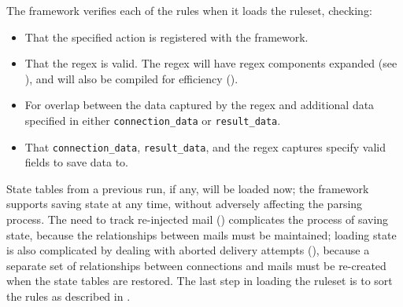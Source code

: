 The framework verifies each of the rules when it loads the ruleset,
checking:

\begin{itemize}

    \squeezeitems{}

    \item That the specified action is registered with the framework.

    \item That the regex is valid.  The regex will have regex components
        expanded (see ), and will also be
        compiled for efficiency ().

    \item For overlap between the data captured by the regex and additional
        data specified in either \texttt{connection\_data} or
        \texttt{result\_data}.

    \item That \texttt{connection\_data}, \texttt{result\_data}, and the
        regex captures specify valid fields to save data to.

\end{itemize}

State tables from a previous \parsername{} run, if any, will be loaded now;
the framework supports saving state at any time, without adversely
affecting the parsing process.  The need to track re-injected mail
() complicates the process of saving state,
because the relationships between mails must be maintained; loading state
is also complicated by dealing with aborted delivery attempts
(), because a separate set of
relationships between connections and mails must be re-created when the
state tables are restored.  The last step in loading the ruleset is to sort
the rules as described in .

